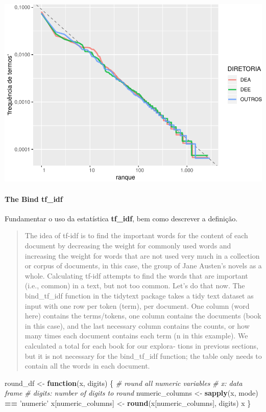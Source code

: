 \documentclass[]{article}
\newenvironment{Shaded}{\begin{snugshade}}{\end{snugshade}}
\newcommand{\KeywordTok}[1]{\textcolor[rgb]{0.13,0.29,0.53}{\textbf{#1}}}
\newcommand{\StringTok}[1]{\textcolor[rgb]{0.31,0.60,0.02}{#1}}
\newcommand{\CommentTok}[1]{\textcolor[rgb]{0.56,0.35,0.01}{\textit{#1}}}
\newcommand{\ControlFlowTok}[1]{\textcolor[rgb]{0.13,0.29,0.53}{\textbf{#1}}}
\newcommand{\OperatorTok}[1]{\textcolor[rgb]{0.81,0.36,0.00}{\textbf{#1}}}
\newcommand{\NormalTok}[1]{#1}
\let\oldparagraph\paragraph
\renewcommand{\paragraph}[1]{\oldparagraph{#1}\mbox{}}
\begin{document}
\includegraphics{markdown_v42_files/figure-latex/unnamed-chunk-34-1.pdf}

\paragraph{\texorpdfstring{The Bind
\textbf{tf\_idf}}{The Bind tf\_idf}}\label{the-bind-tf_idf}

Fundamentar o uso da estatística \textbf{tf\_idf}, bem como descrever a
definição.

\begin{quote}
The idea of tf-idf is to find the important words for the content of
each document by decreasing the weight for commonly used words and
increasing the weight for words that are not used very much in a
collection or corpus of documents, in this case, the group of Jane
Austen's novels as a whole. Calculating tf-idf attempts to find the
words that are important (i.e., common) in a text, but not too common.
Let's do that now. The bind\_tf\_idf function in the tidytext package
takes a tidy text dataset as input with one row per token (term), per
document. One column (word here) contains the terms/tokens, one column
contains the documents (book in this case), and the last necessary
column contains the counts, or how many times each document contains
each term (n in this example). We calculated a total for each book for
our explora‐ tions in previous sections, but it is not necessary for the
bind\_tf\_idf function; the table only needs to contain all the words in
each document.
\end{quote}

\begin{Shaded}
\begin{Highlighting}[]
\NormalTok{round_df <-}\StringTok{ }\ControlFlowTok{function}\NormalTok{(x, digits) \{}
    \CommentTok{# round all numeric variables}
    \CommentTok{# x: data frame }
    \CommentTok{# digits: number of digits to round}
\NormalTok{    numeric_columns <-}\StringTok{ }\KeywordTok{sapply}\NormalTok{(x, mode) }\OperatorTok{==}\StringTok{ 'numeric'}
\NormalTok{    x[numeric_columns] <-}\StringTok{  }\KeywordTok{round}\NormalTok{(x[numeric_columns], digits)}
\NormalTok{    x}
\NormalTok{\}}
\end{Highlighting}
\end{Shaded}
\end{document}
